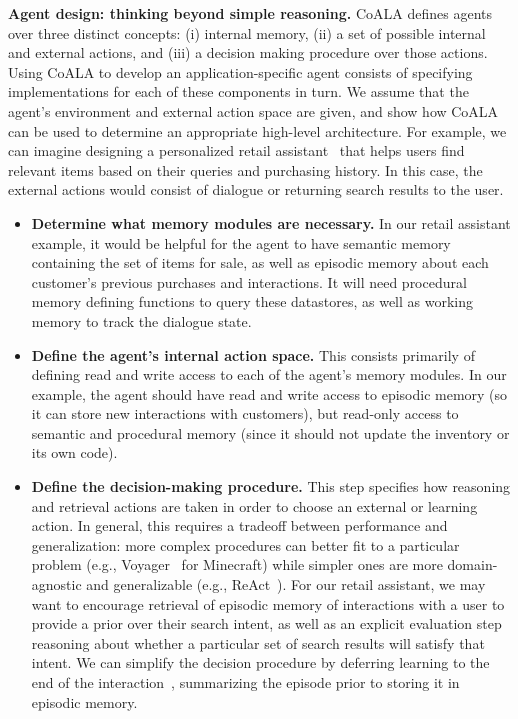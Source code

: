 \documentclass[10pt]{article} %
\begin{document}
\textbf{Agent design: thinking beyond simple reasoning.} CoALA defines agents over three distinct concepts: (i) internal memory, (ii) a set of possible internal and external actions, and (iii) a decision making procedure over those actions. Using CoALA to develop an application-specific agent consists of specifying implementations for each of these components in turn. We assume that the agent's environment and external action space are given, and show how CoALA can be used to determine an appropriate high-level architecture. For example, we can imagine designing a personalized retail assistant~\citep{yao2022webshop} that helps users find relevant items based on their queries and purchasing history. In this case, the external actions would consist of dialogue or returning search results to the user.

\begin{itemize}
\item \textbf{Determine what memory modules are necessary.} In our retail assistant example, it would be helpful for the agent to have semantic memory containing the set of items for sale, as well as episodic memory about each customer's previous purchases and interactions. It will need procedural memory defining functions to query these datastores, as well as working memory to track the dialogue state.

\item \textbf{Define the agent's internal action space.} This consists primarily of defining read and write access to each of the agent's memory modules. In our example, the agent should have read and write access to episodic memory (so it can store new interactions with customers), but read-only access to semantic and procedural memory (since it should not update the inventory or its own code).

\item \textbf{Define the decision-making procedure.} This step specifies how reasoning and retrieval actions are taken in order to choose an external or learning action. In general, this requires a tradeoff between performance and generalization: more complex procedures can better fit to a particular problem (e.g., Voyager~\citep{wang2023voyager} for Minecraft) while simpler ones are more domain-agnostic and generalizable (e.g., ReAct~\citep{yao2022react}). For our retail assistant, we may want to encourage retrieval of episodic memory of interactions with a user to provide a prior over their search intent, as well as an explicit evaluation step reasoning about whether a particular set of search results will satisfy that intent. We can simplify the decision procedure by deferring learning to the end of the interaction~\citep{shinn2023reflexion, park2023generative}, summarizing the episode prior to storing it in episodic memory.
\end{itemize}
\end{document}
